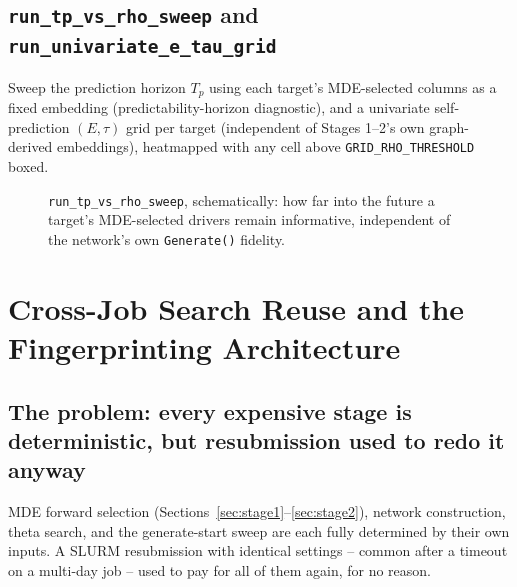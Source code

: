 \documentclass[11pt]{article}
\begin{document}
\subsection{\texttt{run\_tp\_vs\_rho\_sweep} and \texttt{run\_univariate\_e\_tau\_grid}}
Sweep the prediction horizon $T_p$ using each target's MDE-selected columns as a fixed embedding (predictability-horizon diagnostic), and a univariate self-prediction $(E,\tau)$ grid per target (independent of Stages 1--2's own graph-derived embeddings), heatmapped with any cell above \texttt{GRID\_RHO\_THRESHOLD} boxed.

\begin{figure}[H]
\centering
{}
\caption{\texttt{run\_tp\_vs\_rho\_sweep}, schematically: how far into the future a target's MDE-selected drivers remain informative, independent of the network's own \texttt{Generate()} fidelity.}
\label{fig:tp-sweep-schematic}
\end{figure}

\newpage
\section{Cross-Job Search Reuse and the Fingerprinting Architecture}
\label{sec:reuse}

\subsection{The problem: every expensive stage is deterministic, but resubmission used to redo it anyway}
MDE forward selection (Sections~\ref{sec:stage1}--\ref{sec:stage2}), network construction, theta search, and the generate-start sweep are each fully determined by their own inputs. A SLURM resubmission with identical settings -- common after a timeout on a multi-day job -- used to pay for all of them again, for no reason.
\end{document}
